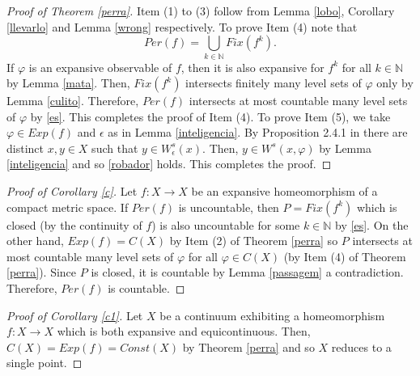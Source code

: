 \documentclass[11pt,letterpaper]{amsart}
\begin{document}
\begin{proof}[Proof of Theorem \ref{perra}]
Item (1) to (3) follow from Lemma \ref{lobo}, Corollary \ref{llevarlo}
and Lemma \ref{wrong} respectively.
To prove Item (4) note that
\begin{equation}
\label{es}
Per(f)=\bigcup_{k\in\mathbb{N}}Fix(f^k).
\end{equation}
If $\varphi$ is an expansive observable of $f$, then it is also expansive for $f^k$ for all $k\in\mathbb{N}$ by Lemma \ref{mata}.
Then, $Fix(f^k)$ intersects finitely many level sets of $\varphi$ only by Lemma \ref{culito}. Therefore, $Per(f)$ intersects at most countable many
level sets of $\varphi$ by \eqref{es}. This completes the proof of Item (4).
To prove Item (5), we take $\varphi\in Exp(f)$ and $\epsilon$ as in Lemma \ref{inteligencia}.
By Proposition 2.4.1 in \cite{bs} there are distinct $x,y\in X$ such that
$y\in W^s_\epsilon(x)$. Then, $y\in W^s(x,\varphi)$ by Lemma \ref{inteligencia}
and so \eqref{robador} holds. This completes the proof.
\end{proof}



\begin{proof}[Proof of Corollary \ref{c}]
Let $f:X\to X$ be an expansive homeomorphism of a compact metric space.
If $Per(f)$ is uncountable, then $P=Fix(f^k)$ which is closed (by the continuity of $f$) is also uncountable for some $k\in\mathbb{N}$ by \eqref{es}.
On the other hand, $Exp(f)=C(X)$ by Item (2) of Theorem \ref{perra} so $P$ intersects at most countable many level sets of $\varphi$ for all $\varphi\in C(X)$ (by Item (4) of Theorem \ref{perra}). Since $P$ is closed, it is countable by Lemma \ref{passagem} a contradiction. Therefore, $Per(f)$ is countable.
\end{proof}


\begin{proof}[Proof of Corollary \ref{c1}]
Let $X$ be a continuum exhibiting a homeomorphism $f:X\to X$ which is both expansive and equicontinuous. Then, $C(X)=Exp(f)=Const(X)$ by Theorem \ref{perra} and so $X$ reduces to a single point.
\end{proof}
\end{document}
